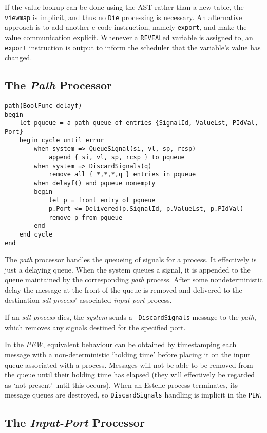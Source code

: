 If the value lookup can be done using the AST rather than a new
table, the {\tt viewmap} is implicit, and thus no {\tt Die}
processing is necessary.
An alternative approach is to add another e-code instruction,
namely {\tt export}, and make the value communication explicit.
Whenever a {\tt REVEAL}ed variable is assigned to, an {\tt export}
instruction is output to inform the scheduler that the
variable's value has changed.

\subsection{The {\em Path} Processor}

\begin{verbatim}
path(BoolFunc delayf)
begin
    let pqueue = a path queue of entries {SignalId, ValueLst, PIdVal, Port}
    begin cycle until error
        when system => QueueSignal(si, vl, sp, rcsp)
            append { si, vl, sp, rcsp } to pqueue
        when system => DiscardSignals(q)
            remove all { *,*,*,q } entries in pqueue
        when delayf() and pqueue nonempty
        begin
            let p = front entry of pqueue
            p.Port <= Delivered(p.SignalId, p.ValueLst, p.PIdVal)
            remove p from pqueue
        end
    end cycle
end
\end{verbatim}

The {\em path} processor handles the queueing of signals for a
process.
It effectively is just a delaying queue.
When the system  queues a signal, it is appended to the queue
maintained by the corresponding {\em path} process.
After some nondeterministic delay the message at the front of the
queue is removed and delivered to the destination 
{\em sdl-process}' associated {\em input-port} process.

If an {\em sdl-process} dies, the {\em system} sends a {\tt
DiscardSignals} message to the {\em path}, which removes any signals
destined for the specified port. 

In the {\em PEW}, equivalent behaviour can be obtained by
timestamping each message with a non-deterministic `holding time'
before placing it on the input queue associated with a process.
Messages will not be able to be removed from the queue until their
holding time has elapsed (they will effectively be regarded as `not
present' until this occurs). 
When an Estelle process terminates, its message queues are destroyed,
so {\tt DiscardSignals} handling is implicit in the {\tt PEW}.

\subsection{The {\em Input-Port} Processor}

